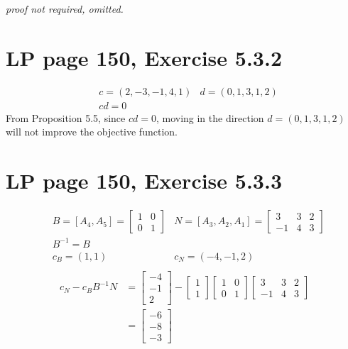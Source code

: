 \documentclass[11pt]{article}
\begin{document}
\textit{proof not required, omitted.}

\section{LP page 150, Exercise 5.3.2}
\begin{align*}
    & c = (2, -3, -1, 4, 1) & d =(0, 1, 3, 1, 2) \\
    & cd = 0
\end{align*}
From Proposition 5.5, since $cd = 0$, moving in the direction $ d =(0, 1, 3, 1, 2)$ will not improve the objective function.

\section{LP page 150, Exercise 5.3.3}

\begin{align*}
    & B = [A_4, A_5] = \begin{bmatrix} 1 & 0 \\ 0 & 1\end{bmatrix} & N = [A_3, A_2, A_1] = \begin{bmatrix} 3 & 3 & 2 \\ -1 & 4 & 3\end{bmatrix} \\
    & B^{-1} = B \\
    & c_B = (1, 1) & c_N = (-4, -1, 2) \\
\end{align*}
\begin{align*}
    c_N - c_B B^{-1}N &= \begin{bmatrix} -4 \\ -1 \\ 2 \end{bmatrix}  - \begin{bmatrix} 1 \\ 1 \end{bmatrix} \begin{bmatrix} 1 & 0 \\ 0 & 1 \end{bmatrix} \begin{bmatrix} 3 & 3 & 2 \\ -1 & 4 & 3\end{bmatrix} \\
    &= \begin{bmatrix} -6 \\ -8 \\ -3 \end{bmatrix}
\end{align*}
\end{document}
